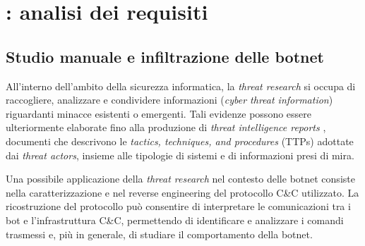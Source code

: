 \chapter{\system{}: analisi dei requisiti} \label{chap:problema} %


\section{Studio manuale e infiltrazione delle botnet} %

All'interno dell'ambito della sicurezza informatica, la \emph{threat research} si occupa di raccogliere, analizzare e condividere informazioni (\emph{cyber threat information}) riguardanti minacce esistenti o emergenti. Tali evidenze possono essere ulteriormente elaborate fino alla produzione di \emph{threat intelligence reports} \cite{johnson2016threatintelligence}, documenti che descrivono le \emph{tactics, techniques, and procedures} (TTPs) adottate dai \emph{threat actors}, insieme alle tipologie di sistemi e di informazioni presi di mira.


Una possibile applicazione della \emph{threat research} nel contesto delle botnet consiste nella caratterizzazione e nel reverse engineering del protocollo C\&C utilizzato. La ricostruzione del protocollo può consentire di interpretare le comunicazioni tra i bot e l'infrastruttura C\&C, permettendo di identificare e analizzare i comandi trasmessi e, più in generale, di studiare il comportamento della botnet.


